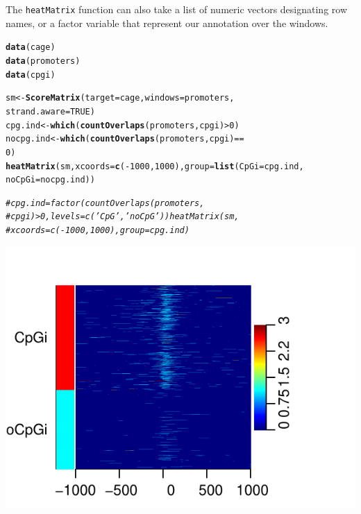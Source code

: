 \documentclass{article}\usepackage[]{graphicx}\usepackage[]{color}
\makeatletter
\def\maxwidth{ %
  \ifdim\Gin@nat@width>\linewidth
    \linewidth
  \else
    \Gin@nat@width
  \fi
}
\newcommand{\hlnum}[1]{\textcolor[rgb]{0.686,0.059,0.569}{#1}}%
\newcommand{\hlcom}[1]{\textcolor[rgb]{0.678,0.584,0.686}{\textit{#1}}}%
\newcommand{\hlopt}[1]{\textcolor[rgb]{0,0,0}{#1}}%
\newcommand{\hlstd}[1]{\textcolor[rgb]{0.345,0.345,0.345}{#1}}%
\newcommand{\hlkwb}[1]{\textcolor[rgb]{0.69,0.353,0.396}{#1}}%
\newcommand{\hlkwc}[1]{\textcolor[rgb]{0.333,0.667,0.333}{#1}}%
\newcommand{\hlkwd}[1]{\textcolor[rgb]{0.737,0.353,0.396}{\textbf{#1}}}%
\newenvironment{kframe}{%
 \def\at@end@of@kframe{}%
 \ifinner\ifhmode%
  \def\at@end@of@kframe{\end{minipage}}%
  \begin{minipage}{\columnwidth}%
 \fi\fi%
 \def\FrameCommand##1{\hskip\@totalleftmargin \hskip-\fboxsep
 \colorbox{shadecolor}{##1}\hskip-\fboxsep
     \hskip-\linewidth \hskip-\@totalleftmargin \hskip\columnwidth}%
 \MakeFramed {\advance\hsize-\width
   \@totalleftmargin\z@ \linewidth\hsize
   \@setminipage}}%
 {\par\unskip\endMakeFramed%
 \at@end@of@kframe}
\newenvironment{knitrout}{}{} %
\newcommand{\Rcode}[1]{{\texttt{#1}}}
\makeatother
\begin{document}
The \Rcode{heatMatrix} function can also take a list of numeric vectors 
designating row names, or a factor variable that represent our 
annotation over the windows.
\begin{knitrout}
\color{fgcolor}\begin{kframe}
\begin{alltt}
\hlkwd{data}\hlstd{(cage)}
\hlkwd{data}\hlstd{(promoters)}
\hlkwd{data}\hlstd{(cpgi)}

\hlstd{sm} \hlkwb{<-} \hlkwd{ScoreMatrix}\hlstd{(}\hlkwc{target} \hlstd{= cage,} \hlkwc{windows} \hlstd{= promoters,}
    \hlkwc{strand.aware} \hlstd{=} \hlnum{TRUE}\hlstd{)}
\hlstd{cpg.ind} \hlkwb{<-} \hlkwd{which}\hlstd{(}\hlkwd{countOverlaps}\hlstd{(promoters, cpgi)} \hlopt{>} \hlnum{0}\hlstd{)}
\hlstd{nocpg.ind} \hlkwb{<-} \hlkwd{which}\hlstd{(}\hlkwd{countOverlaps}\hlstd{(promoters, cpgi)} \hlopt{==}
    \hlnum{0}\hlstd{)}
\hlkwd{heatMatrix}\hlstd{(sm,} \hlkwc{xcoords} \hlstd{=} \hlkwd{c}\hlstd{(}\hlopt{-}\hlnum{1000}\hlstd{,} \hlnum{1000}\hlstd{),} \hlkwc{group} \hlstd{=} \hlkwd{list}\hlstd{(}\hlkwc{CpGi} \hlstd{= cpg.ind,}
    \hlkwc{noCpGi} \hlstd{= nocpg.ind))}

\hlcom{# cpg.ind = factor(countOverlaps(promoters,}
\hlcom{# cpgi)>0, levels=c('CpG','noCpG')) heatMatrix(sm,}
\hlcom{# xcoords=c(-1000, 1000), group=cpg.ind)}
\end{alltt}
\end{kframe}

{\centering \includegraphics[width=\maxwidth]{FiguresheatMatrix2} 

}



\end{knitrout}
\end{document}
